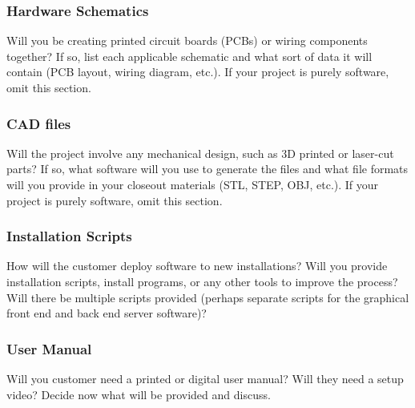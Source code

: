 \subsubsection{Hardware Schematics}
Will you be creating printed circuit boards (PCBs) or wiring components together? If so, list each applicable schematic and what sort of data it will contain (PCB layout, wiring diagram, etc.). If your project is purely software, omit this section.

\subsubsection{CAD files}
Will the project involve any mechanical design, such as 3D printed or laser-cut parts? If so, what software will you use to generate the files and what file formats will you provide in your closeout materials (STL, STEP, OBJ, etc.). If your project is purely software, omit this section.

\subsubsection{Installation Scripts}
How will the customer deploy software to new installations? Will you provide installation scripts, install programs, or any other tools to improve the process? Will there be multiple scripts provided (perhaps separate scripts for the graphical front end and back end server software)? 

\subsubsection{User Manual}
Will you customer need a printed or digital user manual? Will they need a setup video? Decide now what will be provided and discuss.
